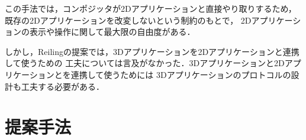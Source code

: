 この手法では，コンポジッタが2Dアプリケーションと直接やり取りするため，
既存の2Dアプリケーションを改変しないという制約のもとで，
2Dアプリケーションの表示や操作に関して最大限の自由度がある．

しかし，Reilingの提案では，3Dアプリケーションを2Dアプリケーションと連携して使うための
工夫については言及がなかった．3Dアプリケーションと2Dアプリケーションとを連携して使うためには
3Dアプリケーションのプロトコルの設計も工夫する必要がある．



\section{提案手法}





